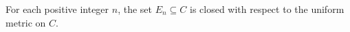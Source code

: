 For each positive integer $n$, the set $E_n \subseteq C$ is closed with respect to the uniform metric on $C$.

